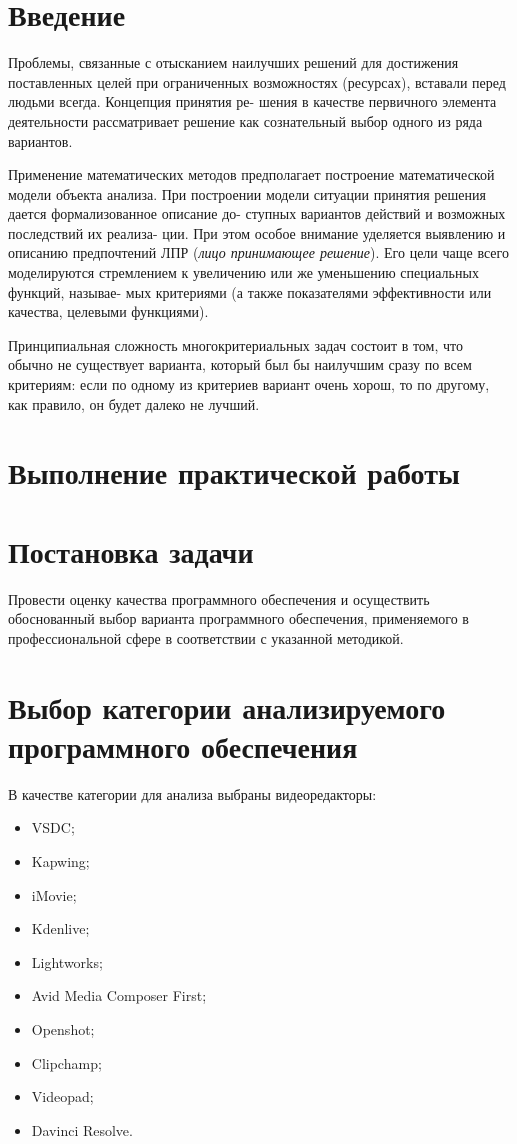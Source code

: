 \section*{\LARGE Введение}
Проблемы, связанные с отысканием наилучших решений для
достижения поставленных целей при ограниченных возможностях
(ресурсах), вставали перед людьми всегда. Концепция принятия ре-
шения в качестве первичного элемента деятельности рассматривает
решение как сознательный выбор одного из ряда вариантов.\par
Применение математических методов предполагает построение
математической модели объекта анализа. При построении модели
ситуации принятия решения дается формализованное описание до-
ступных вариантов действий и возможных последствий их реализа-
ции. При этом особое внимание уделяется выявлению и описанию
предпочтений ЛПР (\textit{лицо принимающее решение}).
Его цели чаще всего моделируются стремлением
к увеличению или же уменьшению специальных функций, называе-
мых критериями (а также показателями эффективности или качества,
целевыми функциями).\par
Принципиальная сложность многокритериальных задач состоит в
том, что обычно не существует варианта, который был бы наилучшим
сразу по всем критериям: если по одному из критериев вариант очень
хорош, то по другому, как правило, он будет далеко не лучший.

\newpage

\section*{\LARGE Выполнение практической работы}

\section{Постановка задачи}
Провести оценку качества программного обеспечения и осуществить
обоснованный выбор варианта программного обеспечения, применяемого в
профессиональной сфере в соответствии с указанной методикой.

\section[Выбор категорий]{Выбор категории анализируемого программного
обеспечения}
В качестве категории для анализа выбраны видеоредакторы:
\begin{itemize}
    \item VSDC;
    \item Kapwing;
    \item iMovie;
    \item Kdenlive;
    \item Lightworks;
    \item Avid Media Composer First;
    \item Openshot;
    \item Clipchamp;
    \item Videopad;
    \item Davinci Resolve.
\end{itemize}

